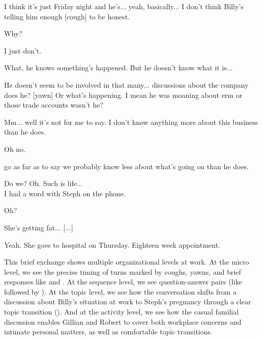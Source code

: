 \ea
\begin{dialogue}
\item[Gillian] I think it's just Friday night and he's... yeah, basically... I don't think Billy's telling him enough [cough] to be honest.

\item[Robert] Why?

\item[Gillian] I just don't.

\item[Robert] [yawn] What, he knows something's happened. But he doesn't know what it is...

\item[Gillian] He doesn't seem to be involved in that many... discussions about the company does he? [yawn] Or what's happening. I mean he was moaning about erm or those trade accounts wasn't he?

\item[Robert] Mm... well it's not for me to say. I don't know anything more about this business than he does.

\item[Gillian] Oh no.

\item[Robert] [...] go as far as to say we probably know less about what's going on than he does.

\item[Gillian] Do we? Oh. Such is life... \\I had a word with Steph on the phone.

\item[Robert] Oh?

\item[Gillian] She's getting fat... [...]

\item[Robert] [...]

\item[Gillian] Yeah. She goes to hospital on Thursday. Eighteen week appointment.
\end{dialogue}
\z
This brief exchange shows multiple organizational levels at work. At the micro level, we see the precise timing of turns marked by coughs, yawns, and brief responses like  and . At the sequence level, we see question-answer pairs (like  followed by ). At the topic level, we see how the conversation shifts from a discussion about Billy's situation at work to Steph's pregnancy through a clear topic transition (). And at the activity level, we see how the casual familial discussion enables Gillian and Robert to cover both workplace concerns and intimate personal matters, as well as comfortable topic transitions.

